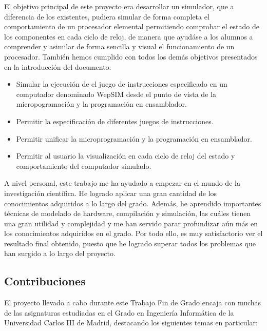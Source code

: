 El objetivo principal de este proyecto era desarrollar un simulador, que a diferencia de los existentes, pudiera simular de forma completa el comportamiento de un procesador elemental permitiendo comprobar el estado de los componentes en cada ciclo de reloj, de manera que ayudáse a los alumnos a comprender y asimilar de forma sencilla y visual el funcionamiento de un procesador.  También hemos cumplido con todos los demás objetivos presentados en la introducción del documento:

\begin{itemize}

\item Simular la ejecución de el juego de instrucciones especificado en un computador denominado WepSIM desde el punto de vista de la micropogramación y la programación en ensamblador.

\item Permitir la especificación de diferentes juegos de instrucciones.

\item Permitir unificar la microprogramación y la programación en ensamblador.

\item Permitir al usuario la visualización en cada ciclo de reloj del estado y comportamiento del computador simulado.

\end{itemize}

A nivel personal, este trabajo me ha ayudado a empezar en el mundo de la investigación científica. He logrado aplicar una gran cantidad de los conocimientos adquiridos a lo largo del grado. Además, he aprendido importantes técnicas de modelado de hardware, compilación y simulación, las cuáles tienen una gran utilidad y complejidad y me han servido parar profundizar aún más en los conocimientos adquiridos en el grado. Por todo ello, es muy satisfactorio ver el resultado final obtenido, puesto que he logrado superar todos los problemas que han surgido a lo largo del proyecto.

\subsection{Contribuciones}

El proyecto llevado a cabo durante este Trabajo Fin de Grado encaja con muchas de las asignaturas estudiadas en el Grado en Ingeniería Informática de la Universidad Carlos III de Madrid, destacando los siguientes temas en particular:

